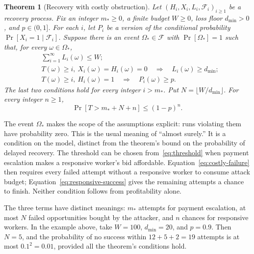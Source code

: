 \documentclass[10pt,letterpaper]{article}
\newtheorem{theorem}{Theorem}
\begin{document}
\begin{theorem}[Recovery with costly obstruction]
\label{thm:live}
Let $(H_i,X_i,L_i,\mathcal F_i)_{i\geq1}$ be a recovery process. Fix an integer $m_*\geq0$, a finite budget $W\geq0$, loss floor $d_{\min}>0$, and $p\in(0,1]$. For each $i$, let $P_i$ be a version of the conditional probability $\Pr[X_i=1\mid\mathcal F_i]$. Suppose there is an event $\Omega_*\in\mathcal F$ with $\Pr[\Omega_*]=1$ such that, for every $\omega\in\Omega_*$,
\begin{align}
 &\sum_{i=1}^{\infty}L_i(\omega)\leq W; \label{eq:loss-budget}\\
 &T(\omega)\geq i,\ X_i(\omega)=H_i(\omega)=0
   \quad\Longrightarrow\quad L_i(\omega)\geq d_{\min}; \label{eq:costly-failure}\\
 &T(\omega)\geq i,\ H_i(\omega)=1
   \quad\Longrightarrow\quad P_i(\omega)\geq p. \label{eq:responsive-success}
\end{align}
The last two conditions hold for every integer $i>m_*$. Put $N=\lfloor W/d_{\min}\rfloor$. For every integer $n\geq1$,
\begin{equation}
 \Pr[T>m_*+N+n]\leq(1-p)^n. \label{eq:live}
\end{equation}
\end{theorem}

The event $\Omega_*$ makes the scope of the assumptions explicit: runs violating them have probability zero. This is the usual meaning of ``almost surely.'' It is a condition on the model, distinct from the theorem's bound on the probability of delayed recovery. The threshold can be chosen from~\eqref{eq:threshold} when payment escalation makes a responsive worker's bid affordable. Equation~\eqref{eq:costly-failure} then requires every failed attempt without a responsive worker to consume attack budget; Equation~\eqref{eq:responsive-success} gives the remaining attempts a chance to finish. Neither condition follows from profitability alone.

The three terms have distinct meanings: $m_*$ attempts for payment escalation, at most $N$ failed opportunities bought by the attacker, and $n$ chances for responsive workers. In the example above, take $W=100$, $d_{\min}=20$, and $p=0.9$. Then $N=5$, and the probability of no success within $12+5+2=19$ attempts is at most $0.1^2=0.01$, provided all the theorem's conditions hold.
\end{document}

